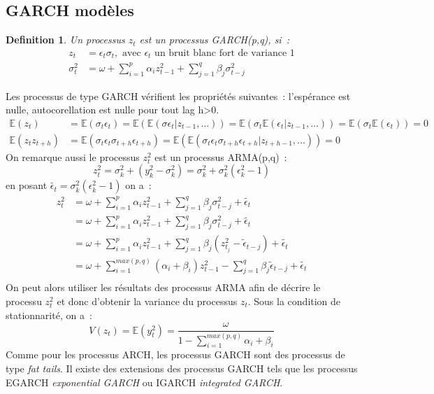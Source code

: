 \documentclass[11pt]{scrartcl} %
\newtheorem{Def}[theorem]{Definition}
\newcommand{\E}[1]{\mathbb{E}\left(#1\right)}
\begin{document}
\subsection{GARCH modèles}
\begin{Def}\label{GARCHDef}
Un processus $z_t$ est un processus GARCH(p,q), si~:
\begin{align*}
z_t&=\epsilon_t\sigma_t,\textrm{ avec }\epsilon_t \textrm{ un bruit blanc fort de variance 1}\\
\sigma_t^2 &= \omega  +\sum_{i=1}^p\alpha_i z_{t-1}^2+\sum_{j=1}^q\beta_j\sigma_{t-j}^2
\end{align*}
\end{Def}
Les processus de type GARCH vérifient les propriétés suivantes~: l'espérance est nulle, autocorellation est nulle pour tout lag h>0.
\begin{align*}
\E{z_t}&= \E{\sigma_t\epsilon_t}=\E{\E{\sigma\epsilon_t|z_{t-1},...}}=\E{\sigma_t\E{\epsilon_t|z_{t-1},...}}=\E{\sigma_t\E{\epsilon_t}}=0\\
\E{z_tz_{t+h}}&=\E{\sigma_t\epsilon_t\sigma_{t+h}\epsilon_{t+h}}=\E{\E{\sigma_t\epsilon_t\sigma_{t+h}\epsilon_{t+h}|z_{t+h-1},...}}=0
\end{align*}
On remarque aussi le processus $z_t^2$ est un processus ARMA(p,q)~:
$$
z_t^2= \sigma_k^2+(y_k^2-\sigma_k^2)=\sigma_k^2+\sigma_k^2(\epsilon_k^2-1)
$$
en posant $\tilde{\epsilon_t}=\sigma_k^2(\epsilon_k^2-1)$ on a~:
\begin{align*}
z_t^2&= \omega  +\sum_{i=1}^p\alpha_i z_{t-1}^2+\sum_{j=1}^q\beta_j\sigma_{t-j}^2 + \tilde{\epsilon_t}\\
&=\omega  +\sum_{i=1}^p\alpha_i z_{t-1}^2+\sum_{j=1}^q\beta_j\sigma_{t-j}^2 + \tilde{\epsilon_t}\\
&=\omega  +\sum_{i=1}^p\alpha_i z_{t-1}^2+\sum_{j=1}^q\beta_j( z^2_{t_j}-\tilde{\epsilon}_{t-j} )+ \tilde{\epsilon_t}\\
&=\omega  +\sum_{i=1}^{max(p,q)}\left(\alpha_i+\beta_i\right) z_{t-1}^2-\sum_{j=1}^q\beta_j\tilde{\epsilon}_{t-j}+ \tilde{\epsilon_t}\\
\end{align*}
On peut alors utiliser les résultats des processus ARMA afin de décrire le processu $z_t^2$ et donc d'obtenir la variance du processus $z_t$. Sous la condition de stationnarité, on a~:
$$
V(z_t)=\E{y_t^2}=\frac{\omega}{1-\sum_{i=1}^{max(p,q)}\alpha_i+\beta_i}
$$
Comme pour les processus ARCH, les processus GARCH sont des processus de type \textit{fat tails}. Il existe des extensions des processus GARCH tels que les processus EGARCH \textit{exponential GARCH} ou IGARCH \textit{integrated GARCH}.
\end{document}
